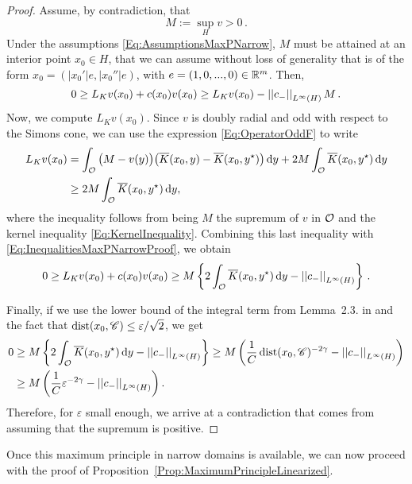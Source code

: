 \begin{proof}
	Assume, by contradiction, that
	$$
	M := \sup_H v > 0\,.
	$$
	Under the assumptions \eqref{Eq:AssumptionsMaxPNarrow}, $M$ must be attained at an interior point $x_0 \in H$, that we can assume without loss of generality that is of the form $x_0 = (|x_0'|e,|x_0''|e)$, with $e=(1,0,...,0)\in\mathbb{R}^m$. Then,
	\begin{equation}
	\label{Eq:InequalitiesMaxPNarrowProof}
	0 \geq L_K  v(x_0) + c(x_0)v(x_0) \geq L_K  v(x_0) - \left | \left |{c_-} \right | \right |_{L^\infty(H)}M\,.
	\end{equation} 
	Now, we compute $L_K  v(x_0)$. Since $v$ is doubly radial and odd with respect to the Simons cone, we can use the expression \eqref{Eq:OperatorOddF} to write
	\begin{align*}
	L_K v(x_0) &= \int_{\mathcal{O}} \big (M - v(y) \big) \big (\overline{K}(x_0,y) -\overline{K}(x_0,y^\star)\big) \,\mathrm{d} y + 2M\int_{\mathcal{O}} \overline{K}(x_0,y^\star)\,\mathrm{d} y\\
    &\geq2M \int_{\mathcal{O}} \overline{K}(x_0,y^\star)\,\mathrm{d} y,
	\end{align*}
    where the inequality follows from being $M$ the supremum of $v$ in $\mathcal{O}$ and the kernel inequality \eqref{Eq:KernelInequality}. Combining this last inequality with \eqref{Eq:InequalitiesMaxPNarrowProof}, we obtain
	$$
	0 \geq L_K  v(x_0) + c(x_0)v(x_0)  \geq M \left\{ 2 \int_{\mathcal{O}} \overline{K}(x_0,y^\star)\,\mathrm{d} y - \left | \left |{c_-} \right | \right |_{L^\infty(H)}
	\right\}\,.
	$$
	
	Finally, if we use the lower bound of the integral term from Lemma~2.3. in \cite{FelipeSanz-Perela:IntegroDifferentialI} and the fact that $\operatorname{dist}(x_0,\mathscr{C}) \leq \varepsilon/\sqrt{2}$, we get
	\begin{align*}
	0 &\geq M \left\{ 2 \int_{\mathcal{O}} \overline{K}(x_0,y^\star)\,\mathrm{d} y - \left | \left |{c_-} \right | \right |_{L^\infty(H)}
	\right\} \geq M \left(\frac{1}{C}\operatorname{dist}(x_0,\mathscr{C})^{-2\gamma}-\left | \left |{c_-} \right | \right |_{L^\infty(H)}\right) \\ &\geq M \left(\frac{1}{C}\varepsilon^{-2\gamma}-\left | \left |{c_-} \right | \right |_{L^\infty(H)}\right).
	\end{align*}
	Therefore, for $\varepsilon$ small enough, we arrive at a contradiction that comes from assuming that the supremum is positive.
\end{proof}


Once this maximum principle in narrow domains is available, we can now proceed with the proof of Proposition~\ref{Prop:MaximumPrincipleLinearized}.

